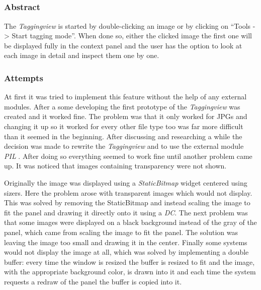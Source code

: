 \subsection{}
\def\kapitelautor{Christoph Führer, Clemens Stadlbauer, Erik Ritschl}

\subsubsection{Abstract}

The  \emph{Taggingview} is started by double-clicking an image or by clicking on ``Tools -> Start tagging mode''. When done so, either the clicked image the first one will be displayed fully in the context panel and the user has the option to look at each image in detail and inspect them one by one.

\subsubsection{Attempts}

At first it was tried to implement this feature without the help of any external modules. After a some developing the first prototype of the \emph{Taggingview} was created and it worked fine. The problem was that it only worked for JPGs and changing it up so it worked for every other file type too was far more difficult than it seemed in the beginning. After discussing and researching a while the decision was made to rewrite the \emph{Taggingview} and to use the external module \emph{PIL} \cite{PIL}. After doing so everything seemed to work fine until another problem came up. It was noticed that images containing transparency were not shown. 

Originally the image was displayed using a \emph{StaticBitmap} widget centered
using sizers. Here the problem arose with transparent images which would not
display. This was solved by removing the StaticBitmap and instead scaling the
image to fit the panel and drawing it directly onto it using a \emph{DC}. The
next problem was that some images were displayed on a black background instead
of the gray of the panel, which came from scaling the image to fit the panel.
The solution was leaving the image too small and drawing it in the center. Finally
some systems would not display the image at all, which was solved by
implementing a double buffer: every time the window is resized the buffer is
resized to fit and the image, with the appropriate background color, is drawn
into it and each time the system requests a redraw of the panel the buffer is
copied into it.

